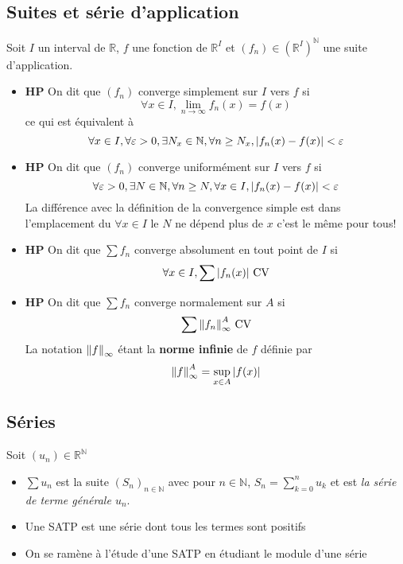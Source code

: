 \documentclass[11pt,colorlinks]{book}
\theoremstyle{mytheoremstyle}
\theoremstyle{mytheoremstyle}
\theoremstyle{mytheoremstyle}
\theoremstyle{mytheoremstyle}
\theoremstyle{mytheoremstyle}
\theoremstyle{mytheoremstyle}
\theoremstyle{mytheoremstyle}
\theoremstyle{mytheoremstyle}
\theoremstyle{myproblemstyle}
\def\mbb#1{\mathbb{#1}}
\def\bN{\mbb{N}}
\def\bR{\mbb{R}}
\def\ln{\lim_{n \to \infty}}
\def\rN{\bR^{\bN}}
\begin{document}
\subsection{Suites et série d'application}
\begin{rmq}
  Soit $I$ un interval de $\bR$, $f$ une fonction de $\bR^{I}$ et $(f_n) \in \left(\bR^{I}\right)^{\bN}$ une suite d'application.
  \begin{itemize}
    \item \textbf{HP} On dit que $(f_n)$ converge simplement sur $I$ vers $f$ si 
    \begin{equation*}
      \forall x \in I, \ln f_n(x) = f(x)
    \end{equation*}
    ce qui est équivalent à 
    \begin{equation*}
      \forall x \in I, \forall \varepsilon > 0, \exists N_x \in \bN, \forall n \geq N_x, \abs{f_n(x) - f(x)} < \varepsilon
    \end{equation*}
    \item \textbf{HP} On dit que $(f_n)$ converge uniformément sur $I$ vers $f$ si 
    \begin{equation*}
      \forall \varepsilon > 0, \exists N \in \bN, \forall n \geq N, \forall x \in I, \abs{f_n(x) - f(x)} < \varepsilon
    \end{equation*}
    La différence avec la définition de la convergence simple est dans l'emplacement du $\forall x \in I$ le $N$ ne dépend plus de $x$
    c'est le même pour tous!
    \item \textbf{HP} On dit que $\sum f_n$ converge absolument en tout point de $I$ si 
    \begin{equation*}
      \forall x \in I, \sum \abs{f_n(x)} \text{ CV}
    \end{equation*} 
    \item \textbf{HP} On dit que $\sum f_n$ converge normalement sur $A$ si 
    \begin{equation*}
      \sum \norm{f_n}^A_{\infty} \text{ CV}
    \end{equation*}
    La notation $\norm{f}_{\infty}$ étant la \textbf{norme infinie} de $f$ définie par 
    \begin{equation*}
      \norm{f}^A_{\infty} = \sup_{x \in A} \abs{f(x)}
    \end{equation*}
  \end{itemize}
\end{rmq}
\subsection{Séries}
\begin{rmq}
  Soit $(u_n) \in \rN$
  \begin{itemize}
    \item $\sum u_n$ est la suite $(S_n)_{n\in\bN}$ avec pour $n \in \bN$, $S_n = \sum_{k=0}^n u_k$ et 
    est \textit{la série de terme générale $u_n$}.
    \item Une SATP est une série dont tous les termes sont positifs
    \item On se ramène à l'étude d'une SATP en étudiant le module d'une série
  \end{itemize}
\end{rmq}
\end{document}
